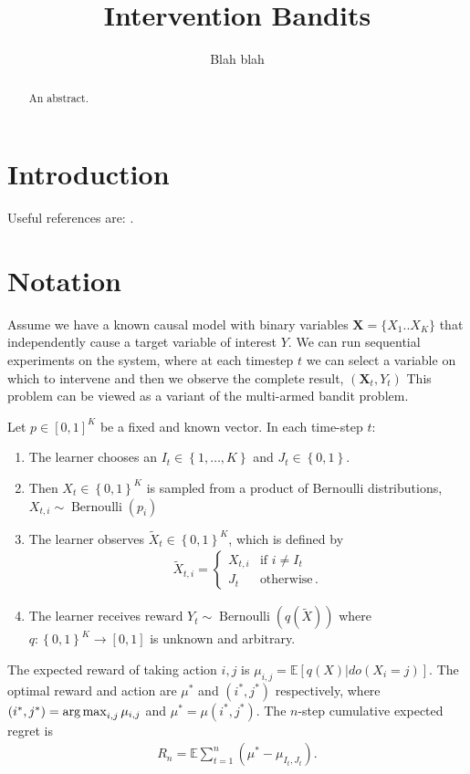 \documentclass{article}
\title{Intervention Bandits}
\author{Blah blah}
\newcommand{\E}{\mathbb E}
\newcommand{\set}[1]{\left\{#1\right\}}
\newcommand{\argmax}{\operatornamewithlimits{arg\,max}}
\newcommand{\eq}[1]{\begin{align*}#1\end{align*}}
\newcommand{\Ber}{\operatorname{Bernoulli}}
\theoremstyle{plain}
\theoremstyle{definition}
\begin{document}
\def\ci{\perp\!\!\!\perp}
\maketitle

\begin{abstract}
An abstract.
\end{abstract}

\section{Introduction}

Useful references are: \cite{BC12}.

\section{Notation}

Assume we have a known causal model with binary variables $\boldsymbol{X} = \{X_{1}..X_{K}\}$ that independently cause a target variable of interest $Y$. We can run sequential experiments on the system, where at each timestep $t$ we can select a variable on which to intervene and then we observe the complete result, $(\boldsymbol{X}_{t},Y_{t})$ This problem can be viewed as a variant of the multi-armed bandit problem.


Let $p \in [0,1]^K$ be a fixed and known vector. In each time-step $t$:
 
\begin{enumerate}
\item The learner chooses an $I_t \in \set{1,\ldots, K}$ and $J_t \in \set{0,1}$.
\item Then $X_t \in \set{0,1}^K$ is sampled from a product of Bernoulli distributions, $X_{t,i} \sim \Ber(p_i)$ 
\item The learner observes $\tilde X_t \in \set{0,1}^K$, which is defined by 
\eq{
\tilde X_{t,i} = \begin{cases}
X_{t,i} &\text{if } i \neq I_t \\
J_t & \text{otherwise}\,.
\end{cases}
}
\item The learner receives reward $Y_t \sim \Ber(q(\tilde X))$ where $q:\set{0,1}^K \to [0,1]$ is unknown and arbitrary.
\end{enumerate}
The expected reward of taking action $i,j$ is $\mu_{i,j} = \E[q(X)|do(X_i = j)]$. The optimal reward and action are $\mu^*$ and $(i^*,j^*)$ respectively,
where $(i^*,j^*) = \argmax_{i,j} \mu_{i,j}$ and $\mu^* = \mu(i^*,j^*)$. The $n$-step cumulative expected regret is
\eq{
R_n = \E \sum_{t=1}^n \left(\mu^* - \mu_{I_t,J_t}\right).
}
\end{document}
